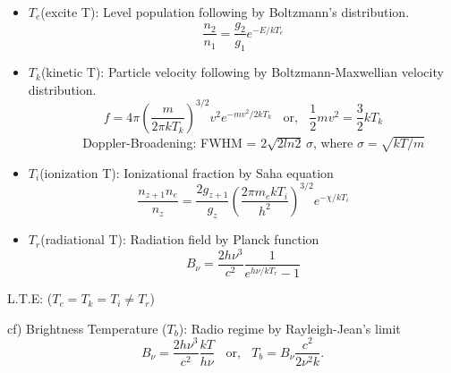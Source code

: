 \begin{itemize}
   \item $T_{e}$(excite T): Level population following by Boltzmann's distribution. \\
   \begin{equation}
      \frac{n_{2}}{n_{1}} = \frac{g_{2}}{g_{1}} e^{-E/kT_{e}}
   \end{equation}
   \item $T_{k}$(kinetic T): Particle velocity following by Boltzmann-Maxwellian velocity distribution. \\
   \begin{equation}
      f = 4\pi\left( \frac{m}{2\pi k T_{k}} \right)^{3/2} v^{2} e^{-mv^{2}/2 k T_{k}} ~~~~\textrm{or,} ~~~~\frac{1}{2} m v^{2} =\frac{3}{2} k T_{k}
   \end{equation}
   $~~~~~~~~~~~~~~~~~~$ Doppler-Broadening: FWHM = $2 \sqrt{2 ln 2}\, \sigma$, where $\sigma = \sqrt{kT/m}$
   \item $T_{i}$(ionization T): Ionizational fraction by Saha equation
   \begin{equation}
      \frac{n_{z+1}n_{e}}{n_{z}} = \frac{2g_{z+1}}{g_{z}}\left( \frac{2\pi m_{e}k T_{i}}{h^{2}} \right)^{3/2} e^{-\chi/k T_{i}}
   \end{equation}
   \item $T_{r}$(radiational T): Radiation field by Planck function
   \begin{equation}
      B_{\nu} = \frac{2 h \nu^{3}}{c^{2}} \frac{1}{e^{h \nu/kT_{r}} -1}
   \end{equation}
\end{itemize}

L.T.E: ($T_{e} = T_{k} = T_{i} \ne T_{r}$)

cf) Brightness Temperature ($T_{b}$): Radio regime by Rayleigh-Jean's limit
\begin{equation}
   B_{\nu} = \frac{2 h \nu^{3}}{c^{2}} \frac{kT}{h\nu} ~~~~\textrm{or,} ~~~~ T_{b} = B_{\nu} \frac{c^{2}}{2\nu^{2}k}.
\end{equation}

%
%
